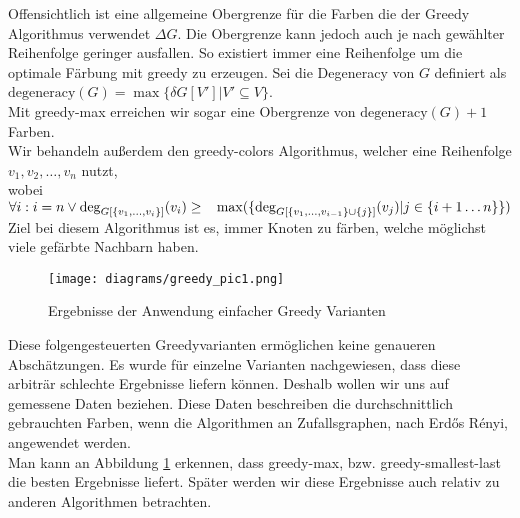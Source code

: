 \documentclass[11pt]{article}
\newcommand{\degeneracy}{\text{degeneracy}}
\begin{document}
Offensichtlich ist eine allgemeine Obergrenze für die Farben die der Greedy Algorithmus verwendet $\Delta G$.
Die Obergrenze kann jedoch auch je nach gewählter Reihenfolge geringer ausfallen. 
So existiert immer eine Reihenfolge um die optimale Färbung mit greedy zu erzeugen.
Sei die Degeneracy von $G$ definiert als\\
$\degeneracy(G)=\max\{\delta G[V']|V'\subseteq V\}$.\\
Mit greedy-max erreichen wir sogar eine Obergrenze von $\degeneracy(G)+1$ Farben.\\
Wir behandeln außerdem den greedy-colors Algorithmus, 
welcher eine Reihenfolge $v_1,v_2,\ldots,v_n$ nutzt,\\ 
wobei $\forall i: i=n\lor
\deg_{G[\{v_1,\ldots,v_i\}]}(v_i)\geq\\
\ \ \max(\{\deg_{G[\{v_1,\ldots,v_{i-1}\}\cup\{j\}]}(v_j)|j\in\{i+1\ldots n\}\})$
Ziel bei diesem Algorithmus ist es, immer Knoten zu färben, welche möglichst viele gefärbte Nachbarn haben.
\begin{figure}
  \texttt{[image: diagrams/greedy\_pic1.png]}
  \caption{Ergebnisse der Anwendung einfacher Greedy Varianten}
  \label{fig:greedy1}
\end{figure}
Diese folgengesteuerten Greedyvarianten ermöglichen keine genaueren Abschätzungen.
Es wurde für einzelne Varianten nachgewiesen, dass diese arbiträr schlechte Ergebnisse liefern können.\cite{greedy_mitchem}
Deshalb wollen wir uns auf gemessene Daten beziehen. Diese Daten beschreiben die durchschnittlich gebrauchten Farben, wenn die Algorithmen an Zufallsgraphen, nach Erdős Rényi, angewendet werden.\cite{greedy_erdos_renyi}\\
Man kann an Abbildung \ref{fig:greedy1} erkennen, 
dass greedy-max, bzw. greedy-smallest-last die besten Ergebnisse liefert. Später werden wir diese Ergebnisse auch relativ zu anderen Algorithmen betrachten.
\end{document}
